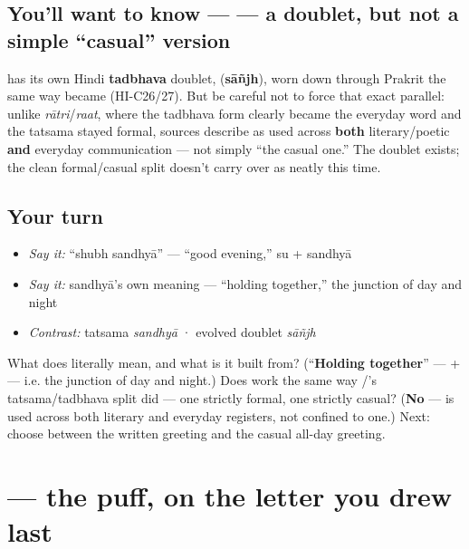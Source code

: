 \subsection*{You'll want to know —  — a doublet, but not a simple \textquotedblleft{}casual\textquotedblright{} version}
 has its own Hindi \textbf{tadbhava} doublet, \textbf{} (\textbf{sāñjh}), worn down through Prakrit the same way \textbf{} became \textbf{} (HI-C26/27). But be careful not to force that exact parallel: unlike \emph{rātri}/\emph{raat}, where the tadbhava form clearly became the everyday word and the tatsama stayed formal, sources describe \textbf{} as used across \textbf{both} literary/poetic \textbf{and} everyday communication — not simply \textquotedblleft{}the casual one.\textquotedblright{} The doublet exists; the clean formal/casual split doesn't carry over as neatly this time.

\subsection*{Your turn}
\begin{itemize}
\raggedright
  \item \emph{Say it:} \textquotedblleft{}shubh sandhyā\textquotedblright{} — \textquotedblleft{}good evening,\textquotedblright{} su + sandhyā
  \item \emph{Say it:} sandhyā's own meaning — \textquotedblleft{}holding together,\textquotedblright{} the junction of day and night
  \item \emph{Contrast:} tatsama \emph{sandhyā} · evolved doublet \emph{sāñjh}
\end{itemize}

\begin{tcolorbox}[breakable,colback=teal!4,colframe=teal!35!black,title={Before you move on}]
What does  literally mean, and what is it built from? (\textquotedblleft{}\textbf{Holding together}\textquotedblright{} —  +  — i.e. the junction of day and night.) Does  work the same way /'s tatsama/tadbhava split did — one strictly formal, one strictly casual? (\textbf{No} —  is used across both literary and everyday registers, not confined to one.) Next: choose between the written greeting and the casual all-day greeting.
\end{tcolorbox}
\section[\texorpdfstring{\hi{झ} (jha)}{झ (jha)}]{ — the puff, on the letter you drew last}

